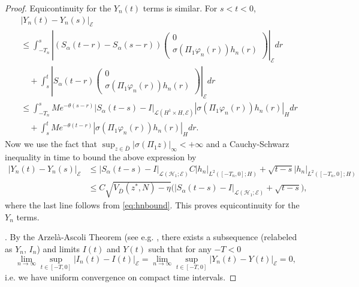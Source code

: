 \documentclass[10pt, reqno]{amsart}
\newcommand{\h}{\mathcal{H}}
\newcommand{\e}{\mathcal{E}}
\theoremstyle{definition}
\numberwithin{lem}{section}
\numberwithin{cor}{section}
\numberwithin{prop}{section}
\numberwithin{thm}{section}
\numberwithin{dfn}{section}
\begin{document}
\begin{proof}
Equicontinuity for the $Y_n(t)$ terms is similar. For $s<t<0$,
\begin{align*}
    &\left|Y_n(t) - Y_n(s) \right|_\e \nonumber\\
    &\leq \int_{-T_n}^s \left| (S_\alpha(t-r)-S_\alpha(s-r)) 
    \begin{pmatrix} 0 \\ \sigma(\Pi_1 \varphi_n(r))h_n(r) \end{pmatrix}\right|_\e dr \nonumber\\
    &\quad+ \int_{s}^t \left|S_\alpha(t-r) \begin{pmatrix} 0 \\ \sigma(\Pi_1 \varphi_n(r))h_n(r) \end{pmatrix}\right|_\e dr\nonumber\\
    &\leq \int_{-T_n}^s M e^{-\theta(s-r)} |S_\alpha(t-s) - I|_{\mathscr{L}(H^1\times H, \e)} | \sigma(\Pi_1 \varphi_n(r))h_n(r)|_H dr\nonumber\\
    &\quad+ \int_s^t M e^{-\theta (t-r)} | \sigma(\Pi_1 \varphi_n(r))h_n(r)|_H dr.
\end{align*}
Now we use the fact that $\sup_{z \in \bar{D}} |\sigma(\Pi_1 z)|_{\infty}<+\infty$ and a Cauchy-Schwarz inequality in time to bound the above expression by
\begin{align*}
    \left|Y_n(t) - Y_n(s) \right|_\e \nonumber
    &\leq |S_\alpha(t-s) - I|_{\mathscr{L}(\h_1; \e)} C | h_n|_{L^2([-T_n,0];H)} +  \sqrt{t-s} | h_n|_{L^2([-T_n,0];H)}\\&
    \leq C \sqrt{V_{\bar{D}}(z^*,N) - \eta}
    \bigg(|S_\alpha(t-s) - I|_{\mathscr{L}(\h_1; \e)}+   \sqrt{t-s} \bigg),
\end{align*}
where the last line follows from \eqref{eq:hnbound}.
This proves equicontinuity for  the $Y_n$ terms.


. By the Arzel\`a-Ascoli Theorem (see e.g. \cite[Theorem 47.1]{Munkres}, there exists a subsequence (relabeled as $Y_n$, $I_n$) and limits $I(t)$ and $Y(t)$ such that for any $-T<0$
\begin{equation*}
    \lim_{n \to \infty} \sup_{t \in [-T,0]} |I_n(t) - I(t)|_\e =\lim_{n \to \infty} \sup_{t \in [-T,0]} |Y_n(t) - Y(t)|_\e=0,
\end{equation*}
i.e. we have uniform convergence on compact time intervals.



\end{proof}
\end{document}
